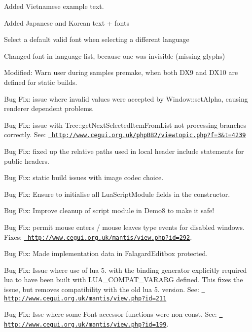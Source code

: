 \begin{DoxyItemize}
\begin{DoxyItemize}
\item Added Vietnamese example text.
\item Added Japanese and Korean text + fonts
\item Select a default valid font when selecting a different language
\item Changed font in language list, because one was invisible (missing glyphs)
\end{DoxyItemize}
\item Modified\+: Warn user during samples premake, when both D\+X9 and D\+X10 are defined for static builds.
\item Bug Fix\+: issue where invalid values were accepted by Window\+::set\+Alpha, causing renderer dependent problems.
\item Bug Fix\+: issue with Tree\+::get\+Next\+Selected\+Item\+From\+List not processing branches correctly. See\+: \href{http://www.cegui.org.uk/phpBB2/viewtopic.php?f=3&t=4239}{\texttt{ http\+://www.\+cegui.\+org.\+uk/php\+B\+B2/viewtopic.\+php?f=3\&t=4239}}
\item Bug Fix\+: fixed up the relative paths used in local header include statements for public headers.
\item Bug Fix\+: static build issues with image codec choice.
\item Bug Fix\+: Ensure to initialise all Lua\+Script\+Module fields in the constructor.
\item Bug Fix\+: Improve cleanup of script module in Demo8 to make it safe!
\item Bug Fix\+: permit mouse enters / mouse leaves type events for disabled windows. Fixes\+: \href{http://www.cegui.org.uk/mantis/view.php?id=292}{\texttt{ http\+://www.\+cegui.\+org.\+uk/mantis/view.\+php?id=292}}.
\item Bug Fix\+: Made implementation data in Falagard\+Editbox protected.
\item Bug Fix\+: Issue where use of lua 5. with the binding generator explicitly required lua to have been built with L\+U\+A\+\_\+\+C\+O\+M\+P\+A\+T\+\_\+\+V\+A\+R\+A\+RG defined. This fixes the issue, but removes compatibility with the old lua 5. version. See\+: \href{http://www.cegui.org.uk/mantis/view.php?id=211}{\texttt{ http\+://www.\+cegui.\+org.\+uk/mantis/view.\+php?id=211}}
\item Bug Fix\+: Isse where some Font accessor functions were non-\/const. See\+: \href{http://www.cegui.org.uk/mantis/view.php?id=199}{\texttt{ http\+://www.\+cegui.\+org.\+uk/mantis/view.\+php?id=199}}.

\end{DoxyItemize}
